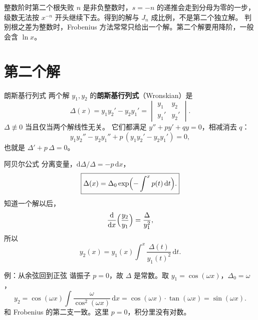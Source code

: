 \documentclass[fontset=windows, chinese, 10pt, xcolor=dvipsnames]{beamer}
\begin{document}
\begin{frame}{整数阶时第二个根失败}
  $n$ 是非负整数时，$s=-n$ 的递推会走到分母为零的一步，级数无法按 $x^{-n}$ 开头继续下去。得到的解与 $J_n$ 成比例，不是第二个独立解。
  \vspace{0.4em}
  判别根之差为整数时，Frobenius 方法常常只给出一个解。第二个解要用降阶，一般会含 $\ln x$。
\end{frame}

\section{第二个解}

\begin{frame}{朗斯基行列式}
  两个解 $y_1,y_2$ 的\textbf{朗斯基行列式}（Wronskian）是
  \begin{equation*}
    \Delta(x)
    =y_1 y_2'-y_2 y_1'
    =\begin{vmatrix}
      y_1 & y_2 \\ y_1' & y_2'
    \end{vmatrix}.
  \end{equation*}
  $\Delta\not\equiv 0$ 当且仅当两个解线性无关。
  \vspace{0.3em}
  它们都满足 $y''+py'+qy=0$，相减消去 $q$：
  \[
    y_1 y_2''-y_2 y_1''+p\,(y_1 y_2'-y_2 y_1')=0,
  \]
  也就是 $\Delta'+p\,\Delta=0$。
\end{frame}

\begin{frame}{阿贝尔公式}
  分离变量，$\mathrm{d}\Delta/\Delta=-p\,\mathrm{d}x$，
  \begin{equation*}
    \boxed{\displaystyle
      \Delta(x)=\Delta_0\exp\Bigl(-\int^{x}p(t)\,\mathrm{d}t\Bigr).}
  \end{equation*}
  知道一个解以后，
  \[
    \frac{\mathrm{d}}{\mathrm{d}x}\Bigl(\frac{y_2}{y_1}\Bigr)
    =\frac{\Delta}{y_1^2},
  \]
  所以
  \begin{equation*}
    \boxed{\displaystyle
      y_2(x)=y_1(x)\int^{x}\frac{\Delta(t)}{y_1(t)^2}\,\mathrm{d}t.}
  \end{equation*}
\end{frame}

\begin{frame}{例：从余弦回到正弦}
  谐振子 $p=0$，故 $\Delta$ 是常数。取 $y_1=\cos(\omega x)$，$\Delta_0=\omega$，
  \[
    y_2=\cos(\omega x)\int\frac{\omega}{\cos^2(\omega x)}\,\mathrm{d}x
    =\cos(\omega x)\cdot\tan(\omega x)
    =\sin(\omega x).
  \]
  和 Frobenius 的第二支一致。这里 $p=0$，积分里没有对数。
\end{frame}
\end{document}
